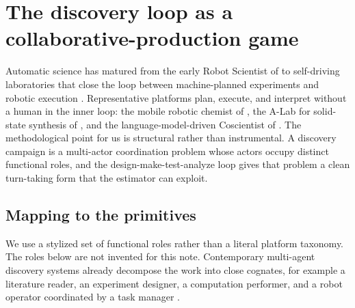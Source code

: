 \documentclass[11pt]{article}
\theoremstyle{definition}
\begin{document}
\section{The discovery loop as a collaborative-production game}

Automatic science has matured from the early Robot Scientist of \citet{king2009} to self-driving laboratories that close the loop between machine-planned experiments and robotic execution \citep{abolhasaniKumacheva2023, tom2024}. Representative platforms plan, execute, and interpret without a human in the inner loop: the mobile robotic chemist of \citet{burger2020}, the A-Lab for solid-state synthesis of \citet{szymanski2023}, and the language-model-driven Coscientist of \citet{boiko2023}. The methodological point for us is structural rather than instrumental. A discovery campaign is a multi-actor coordination problem whose actors occupy distinct functional roles, and the design-make-test-analyze loop gives that problem a clean turn-taking form that the estimator can exploit.

\subsection{Mapping to the primitives}

We use a stylized set of functional roles rather than a literal platform taxonomy. The roles below are not invented for this note. Contemporary multi-agent discovery systems already decompose the work into close cognates, for example a literature reader, an experiment designer, a computation performer, and a robot operator coordinated by a task manager \citep{song2025}.
\end{document}

